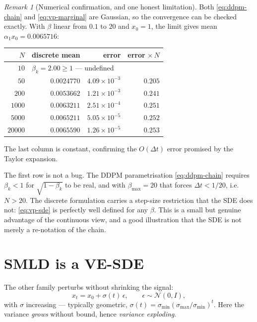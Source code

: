 \documentclass[11pt,a4paper]{report}
\theoremstyle{definition}
\theoremstyle{remark}
\newtheorem{remark}[remark]{Remark}
\begin{document}
\begin{remark}[Numerical confirmation, and one honest limitation]
\label{rem:ddpm-limit-numbers}
Both \eqref{eq:ddpm-chain} and \eqref{eq:vp-marginal} are Gaussian, so the
convergence can be checked exactly. With $\beta$ linear from $0.1$ to $20$
and $x_0=1$, the limit gives mean $\alpha_1x_0=0.0065716$:

\begin{center}
\begin{tabular}{rrrr}
\toprule
$N$ & discrete mean & error & error$\,\times N$ \\
\midrule
$10$ & \multicolumn{3}{l}{$\beta_k=2.00\ge1$ --- undefined} \\
$50$ & $0.0024770$ & $4.09\times10^{-3}$ & $0.205$ \\
$200$ & $0.0053662$ & $1.21\times10^{-3}$ & $0.241$ \\
$1000$ & $0.0063211$ & $2.51\times10^{-4}$ & $0.251$ \\
$5000$ & $0.0065211$ & $5.05\times10^{-5}$ & $0.252$ \\
$20000$ & $0.0065590$ & $1.26\times10^{-5}$ & $0.253$ \\
\bottomrule
\end{tabular}
\end{center}

The last column is constant, confirming the $O(\Delta t)$ error promised by
the Taylor expansion.

The first row is not a bug. The DDPM parametrisation
\eqref{eq:ddpm-chain} requires $\beta_k<1$ for $\sqrt{1-\beta_k}$ to be
real, and with $\beta_{\max}=20$ that forces $\Delta t<1/20$, i.e.\
$N>20$. The discrete formulation carries a step-size restriction that the
SDE does not: \eqref{eq:vp-sde} is perfectly well defined for any $\beta$.
This is a small but genuine advantage of the continuous view, and a good
illustration that the SDE is not merely a re-notation of the chain.
\end{remark}

\section{SMLD is a VE-SDE}
\label{sec:sde-smld-limit}

The other family perturbs without shrinking the signal:
\begin{equation}
\label{eq:smld-chain}
x_t = x_0 + \sigma(t)\,\epsilon,\qquad\epsilon\sim\mathcal N(0,I),
\end{equation}
with $\sigma$ increasing --- typically geometric,
$\sigma(t)=\sigma_{\min}(\sigma_{\max}/\sigma_{\min})^t$. Here the variance
\emph{grows} without bound, hence \emph{variance exploding}.
\end{document}
